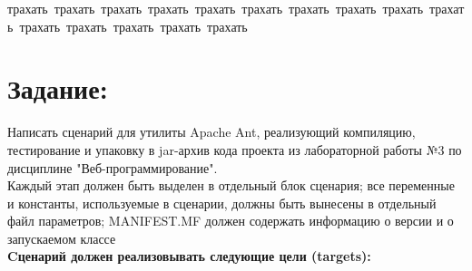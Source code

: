 \thispagestyle{empty}
\BgThispage
\begin{flushright}
    \mbox{трахать трахать трахать трахать трахать трахать трахать трахать трахать трахать трахать трахать трахать трахать трахать}
\end{flushright}
\vspace{5cm}
\tableofcontents

\newpage

\thispagestyle{empty}
\BgThispage
\section{Задание:}
Написать сценарий для утилиты Apache Ant, реализующий компиляцию, тестирование и упаковку в jar-архив кода проекта из лабораторной работы №3 по 
дисциплине "Веб-программирование". \\
Каждый этап должен быть выделен в отдельный блок сценария; все переменные и константы, используемые в сценарии, должны быть вынесены в 
отдельный файл параметров; MANIFEST.MF должен содержать информацию о версии и о запускаемом классе\\
\textbf{Cценарий должен реализовывать следующие цели (targets):}
